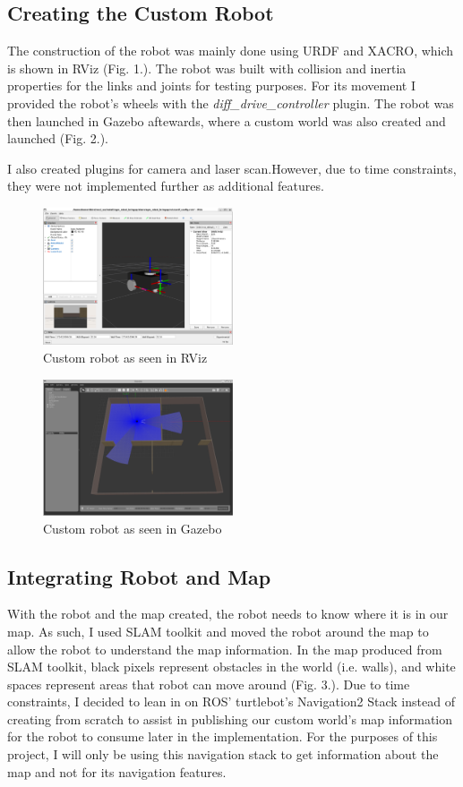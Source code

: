 \documentclass[conference]{IEEEtran}
\begin{document}
\subsection{Creating the Custom Robot}
The construction of the robot was mainly done using URDF and XACRO, which is shown in RViz (Fig. 1.). The robot was built with collision and inertia properties for the links and joints for testing purposes. For its movement I provided the robot's wheels with the \textit{diff\_drive\_controller} plugin. The robot was then launched in Gazebo aftewards, where a custom world was also created and launched (Fig. 2.).

I also created plugins for camera and laser scan.However, due to time constraints, they were not implemented further as additional features.

\begin{figure}[h]
  \centering
  \includegraphics[width=0.5\textwidth]{../assets/robot_rviz.png}
  \caption{Custom robot as seen in RViz}
  \label{fig:example}
\end{figure}
\begin{figure}[h]
  \centering
  \includegraphics[width=0.5\textwidth]{../assets/robot_gazebo.png}
  \caption{Custom robot as seen in Gazebo}
  \label{fig:example}
\end{figure}

\subsection{Integrating Robot and Map}
With the robot and the map created, the robot needs to know where it is in our map. As such, I used SLAM toolkit and moved the robot around the map to allow the robot to understand the map information. In the map produced from SLAM toolkit, black pixels represent obstacles in the world (i.e. walls), and white spaces represent areas that robot can move around (Fig. 3.).
Due to time constraints, I decided to lean in on ROS' turtlebot's Navigation2 Stack instead of creating from scratch to assist in publishing our custom world's map information for the robot to consume later in the implementation. For the purposes of this project, I will only be using this navigation stack to get information about the map and not for its navigation features.
\end{document}
